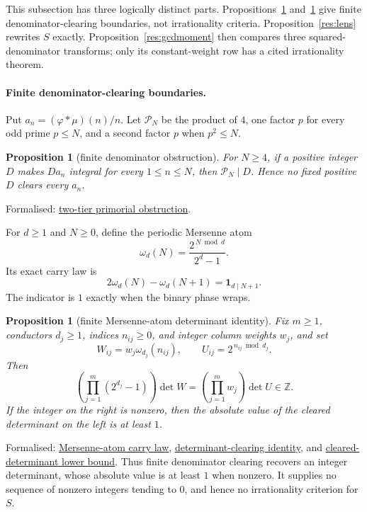 \documentclass[11pt]{article}
\newcommand{\commit}{bb4e24651b37cd096d3749ef299c3317930b3a3b}
\newcommand{\repobase}{https://github.com/wcook04/plectis-lean-erdos249-257/blob/\commit}
\newcommand{\PK}{Erdos249257}
\newcommand{\lword}[4]{\href{\repobase/\PK/#1\#L#2}{#4}}
\newtheorem{proposition}[theorem]{Proposition}
\theoremstyle{definition}
\theoremstyle{remark}
\newcommand{\Z}{\mathbb{Z}}
\newcommand{\ph}{\varphi}
\begin{document}
{This subsection has three logically distinct parts.  Propositions~\ref{res:primitiveindex}
and~\ref{res:mersennetailatoms} give finite denominator-clearing boundaries,
not irrationality criteria.  Proposition~\ref{res:lens} rewrites $S$ exactly.
Proposition~\ref{res:gcdmoment} then compares three squared-denominator transforms;
only its constant-weight row has a cited irrationality theorem.

\paragraph{Finite denominator-clearing boundaries.}\label{sec:primitiveindex}
Put \(a_n=(\ph*\mu)(n)/n\).  Let $\mathcal P_N$ be the product of $4$, one factor
$p$ for every odd prime $p\le N$, and a second factor $p$ when $p^2\le N$.
\begin{proposition}[finite denominator obstruction]
\label{res:primitiveindex}
For $N\ge4$, if a positive integer $D$ makes $Da_n$ integral for every
$1\le n\le N$, then $\mathcal P_N\mid D$.  Hence no fixed positive $D$ clears every
$a_n$.
\end{proposition}
\noindent Formalised:
\lword{PrimitiveDeterminantLift.lean}{148}{twoTierPrimorial_dvd_of_integral_jet}{two-tier primorial obstruction}.

For \(d\ge1\) and $N\ge0$, define the periodic Mersenne atom
\[
 \omega_d(N)=\frac{2^{\,N\bmod d}}{2^d-1}.
\]
Its exact carry law is
\[
 2\omega_d(N)-\omega_d(N+1)=\mathbf1_{d\mid N+1}.
\]
The indicator is \(1\) exactly when the binary phase wraps.

\begin{proposition}[finite Mersenne-atom determinant identity]
\label{res:mersennetailatoms}
Fix \(m\ge1\), conductors \(d_j\ge1\), indices \(n_{ij}\ge0\), and integer
column weights \(w_j\), and set
\[
 W_{ij}=w_j\omega_{d_j}(n_{ij}),
 \qquad U_{ij}=2^{\,n_{ij}\bmod d_j}.
\]
Then
\[
 \left(\prod_{j=1}^m(2^{d_j}-1)\right)\det W
 =\left(\prod_{j=1}^m w_j\right)\det U\in\Z.
\]
If the integer on the right is nonzero, then the absolute value of the
cleared determinant on the left is at least \(1\).
\end{proposition}
\noindent Formalised:
\lword{MersenneTailAtoms.lean}{28}{mersenneTailAtom_step}{Mersenne-atom carry law},
\lword{MersenneTailAtoms.lean}{158}{weightedMersenneAtom_denominatorProduct_mul_det}{determinant-clearing identity},
and
\lword{MersenneTailAtoms.lean}{181}{one_le_abs_weightedMersenneAtom_cleared_det}{cleared-determinant lower bound}.
Thus finite denominator clearing recovers an integer determinant, whose
absolute value is at least $1$ when nonzero.  It supplies no sequence of
nonzero integers tending to $0$, and hence no irrationality criterion for \(S\).

}
\end{document}
